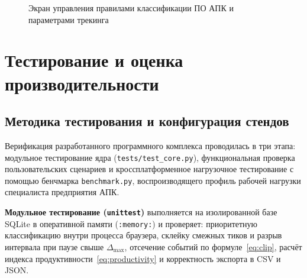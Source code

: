 \documentclass{timcw}
\begin{document}
\begin{figure}[H]
\centering
\caption{Экран управления правилами классификации ПО АПК и параметрами трекинга}
\label{fig:ui_rules}
\end{figure}

\newpage
\chapter{Тестирование и оценка производительности}

\section{Методика тестирования и конфигурация стендов}

Верификация разработанного программного комплекса проводилась в три этапа: модульное тестирование ядра (\texttt{tests/test\_core.py}), функциональная проверка пользовательских сценариев и кроссплатформенное нагрузочное тестирование с помощью бенчмарка \texttt{benchmark.py}, воспроизводящего профиль рабочей нагрузки специалиста предприятия АПК.

\textbf{Модульное тестирование (\texttt{unittest})} выполняется на изолированной базе SQLite в оперативной памяти (\texttt{:memory:}) и проверяет: приоритетную классификацию внутри процесса браузера, склейку смежных тиков и разрыв интервала при паузе свыше $\Delta_{\max}$, отсечение событий по формуле~\eqref{eq:clip}, расчёт индекса продуктивности~\eqref{eq:productivity} и корректность экспорта в CSV и JSON.
\end{document}
